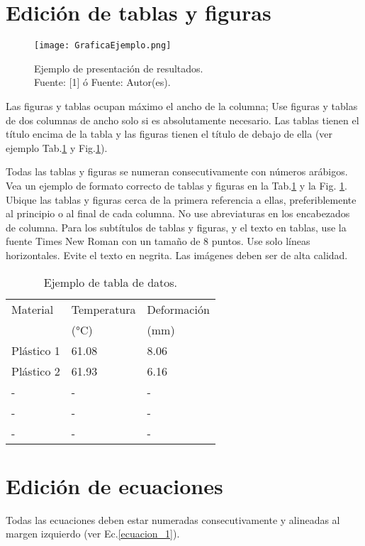 \documentclass[10pt,letterpaper,twocolumn,twoside,fleqn]{article}
\begin{document}
\section{Edición de tablas y figuras}

\begin{figure}[H]
\centering
\texttt{[image: GraficaEjemplo.png]} 
\caption{Ejemplo de presentación de resultados.\\
Fuente: [1]  ó  Fuente: Autor(es).}
\label{figura_1}
\end{figure}


Las figuras y tablas ocupan máximo el ancho de la columna; Use figuras y tablas de dos columnas de ancho solo si es absolutamente necesario.  Las tablas tienen el título encima de la tabla y las figuras tienen el título de debajo de ella (ver ejemplo Tab.\ref{tabla_1} y Fig.\ref{figura_1}). 

Todas las tablas y figuras se numeran consecutivamente con números arábigos. Vea un ejemplo de formato correcto de tablas y figuras en la Tab.\ref{tabla_1} y la Fig. \ref{figura_1}. Ubique las tablas y figuras cerca de la primera referencia a ellas, preferiblemente al principio o al final de cada columna. No use abreviaturas en los encabezados de columna. Para los subtítulos de tablas y figuras, y el texto en tablas, use la fuente Times New Roman con un tamaño de 8 puntos. Use solo líneas horizontales. Evite el texto en negrita. Las imágenes deben ser de alta calidad.


\begin{table}[H]
\centering
\caption{Ejemplo de tabla de datos.}
\begin{tabular}{ p{2.5cm} p{2.5cm} p{2.5cm}}
\hline 
Material & Temperatura  & Deformación \\ 
 & (°C)  & (mm) \\ 
\hline 
Plástico 1 & 61.08 & 8.06 \\
Plástico 2 & 61.93 & 6.16 \\ 
 - & - & - & \\
- & - & - & \\
- & - & - & \\ 
\hline 
\end{tabular} 
\label{tabla_1}
\end{table}

\section{Edición de ecuaciones}
Todas las ecuaciones deben estar numeradas consecutivamente y alineadas al margen izquierdo (ver Ec.\eqref{ecuacion_1}).
\end{document}
